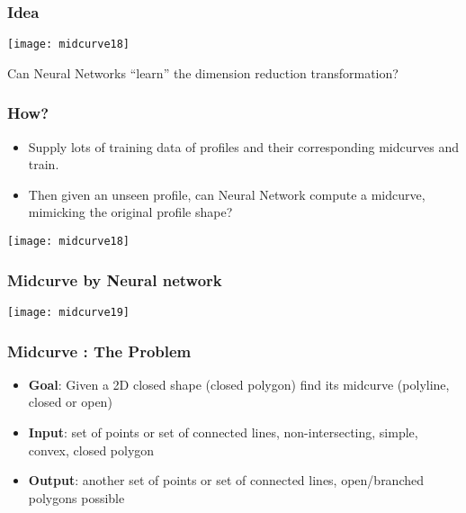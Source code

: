 \begin{frame}[fragile]\frametitle{Idea}
\begin{center}
\texttt{[image: midcurve18]}

Can Neural Networks ``learn'' the dimension reduction transformation?
\end{center}	
\end{frame}

\begin{frame}[fragile]\frametitle{How?}

	\begin{itemize}
	\item Supply lots of training data of profiles and their corresponding midcurves and train.
	\item Then given an unseen profile, can Neural Network compute a midcurve, mimicking the original profile shape?
	\end{itemize}
\begin{center}
\texttt{[image: midcurve18]}
\end{center}	
\end{frame}

\begin{frame}[fragile]\frametitle{Midcurve by Neural network}
\begin{center}
\texttt{[image: midcurve19]}
\end{center}	
\end{frame}

\begin{frame}[fragile]\frametitle{Midcurve : The Problem}

	\begin{itemize}
	\item {\bf Goal}: Given a 2D closed shape (closed polygon) find its midcurve (polyline, closed or open)
	\item {\bf Input}: set of points or set of connected lines, non-intersecting, simple, convex, closed polygon
	\item {\bf Output}: another set of points or set of connected lines, open/branched polygons possible
	\end{itemize}

\end{frame}

